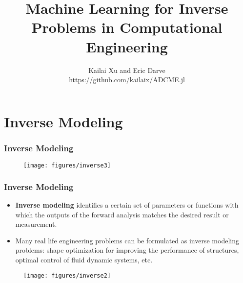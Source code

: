 \documentclass[usenames,dvipsnames]{beamer}
\title[ML for Computational Engineering]{Machine Learning for Inverse Problems in Computational Engineering} %
\author[ADCME]{Kailai Xu and Eric Darve \\ \url{https://github.com/kailaix/ADCME.jl}} %
\date{}%
\begin{document}
\begin{frame}

\titlepage %

\end{frame}
\usebackgroundtemplate{}

\section{Inverse Modeling}




\begin{frame}
	\frametitle{Inverse Modeling}
	\begin{figure}
		\centering
		\texttt{[image: figures/inverse3]}
	\end{figure}
\end{frame}


\begin{frame}
	\frametitle{Inverse Modeling}
	\begin{itemize}
		\item \textbf{Inverse modeling} identifies a certain set of parameters or functions with which the outputs of the forward analysis matches the desired result or measurement.
		\item Many real life engineering problems can be formulated as inverse modeling problems: shape optimization for improving the performance of structures, optimal control of fluid dynamic systems, etc.
	\end{itemize}
	\begin{figure}[hbt]
		\centering
		\texttt{[image: figures/inverse2]}
	\end{figure}
\end{frame}
\end{document}
